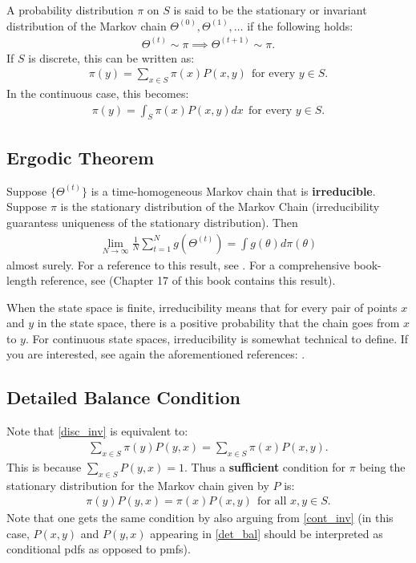 \documentclass{scrartcl}
\begin{document}
A probability distribution $\pi$ on $S$ is said to be the stationary
or invariant distribution of the Markov chain $\Theta^{(0)}, 
\Theta^{(1)}, \dots$ if the following holds:
\begin{align*}
  \Theta^{(t)} \sim \pi \implies \Theta^{(t+1)} \sim \pi. 
\end{align*}
If $S$ is discrete, this can be written as:
\begin{align}\label{disc_inv}
  \pi(y) = \sum_{x \in S} \pi(x) P(x, y) ~~ \text{for every $y \in
  S$}. 
\end{align}
In the continuous case, this becomes:
\begin{align}\label{cont_inv}
  \pi(y) = \int_S \pi(x) P(x, y) dx ~~ \text{for every $y \in
  S$}. 
\end{align}

\subsection{Ergodic Theorem}
Suppose $\{\Theta^{(t)} \}$ is a time-homogeneous Markov chain that is
\textbf{irreducible}. Suppose $\pi$ is the stationary distribution of
the Markov Chain (irreducibility guarantess uniqueness of the
stationary distribution). Then
\begin{align*}
\lim_{N \rightarrow \infty}  \frac{1}{N} \sum_{t=1}^N g(\Theta^{(t)})
  = \int g(\theta) d\pi(\theta)
\end{align*}
almost surely. For a reference to this result, see
\citet[Theorem 4 and the remark after Corollary
6]{RobertsRosenthal2004}. For a comprehensive book-length reference,
see \citet{MeynTweedie2009} (Chapter 17 of this book contains this
result). 

When the state space is finite, irreducibility means that for every
pair of points $x$ and $y$ in the state space, there is a positive
probability that the chain goes from $x$ to $y$. For continuous state
spaces, irreducibility is somewhat technical to define. If you are
interested, see again the aforementioned references:
\citet{RobertsRosenthal2004, MeynTweedie2009}. 

\subsection{Detailed Balance Condition}

Note that \eqref{disc_inv} is equivalent to:
\begin{align*}
  \sum_{x \in S} \pi(y) P(y, x) = \sum_{x \in S} \pi(x) P(x, y). 
\end{align*}
This is because $\sum_{x \in S} P(y, x) = 1$. Thus a
\textbf{sufficient} condition for $\pi$ being the stationary
distribution for the Markov chain given by $P$ is:
\begin{align}\label{det_bal}
  \pi(y) P(y, x) = \pi(x) P(x, y) ~~\text{for all $x, y \in S$}. 
\end{align}
Note that one gets the same condition by also arguing from
\eqref{cont_inv} (in this case, $P(x, y)$ and $P(y, x)$ appearing in
\eqref{det_bal} should be interpreted as conditional pdfs as opposed
to pmfs). 
\end{document}
